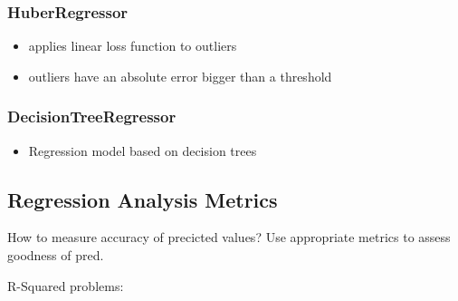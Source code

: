 \subsubsection{HuberRegressor}
\begin{itemize}
	\item applies linear loss function to outliers
	\item outliers have an absolute error bigger than a threshold
\end{itemize}
\subsubsection{DecisionTreeRegressor}
\begin{itemize}
	\item Regression model based on decision trees
\end{itemize}


\subsection{Regression Analysis Metrics}

How to measure accuracy of precicted values?
Use appropriate metrics to assess goodness of pred.



R-Squared problems: 



